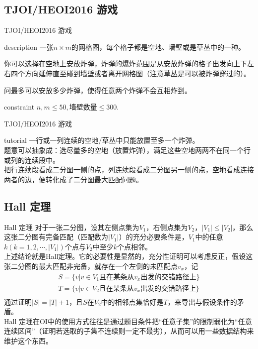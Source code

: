 \documentclass{beamer}
\begin{document}
\subsection{TJOI/HEOI2016 游戏}
\begin{frame}{TJOI/HEOI2016 游戏}
	\begin{block}{description}
		一张$n \times m$的网格图，每个格子都是空地、墙壁或是草丛中的一种。
		
		你可以选择在空地上安放炸弹，炸弹的爆炸范围是从安放炸弹的格子出发向上下左右四个方向延伸直至碰到墙壁或者离开网格图（注意草丛是可以被炸弹穿过的）。
		
		问最多可以安放多少炸弹，使得任意两个炸弹不会互相炸到。
	\end{block}
	\begin{block}{constraint}
		$n, m \le 50, \mbox{墙壁数量}\le 300.$
	\end{block}
\end{frame}
\begin{frame}{TJOI/HEOI2016 游戏}
	\begin{block}{tutorial}
		一行或一列连续的空地/草丛中只能放置至多一个炸弹。\\
		
		题意可以抽象成：选尽量多的空地（放置炸弹），满足这些空地两两不在同一个行或列的连续段中。\\
		
		把行连续段看成二分图一侧的点，列连续段看成二分图另一侧的点，空地看成连接两者的边，便转化成了二分图最大匹配问题。
	\end{block}
\end{frame}
\iffalse
\subsection{Hall 定理}
\begin{frame}{Hall 定理}
	对于一张二分图，设其左侧点集为$V_1$，右侧点集为$V_2$，$|V_1| \le |V_2|$，那么这张二分图有完备匹配（匹配数为$|V_1|$）的充分必要条件是，$V_1$中的任意$k(k = 1, 2, \cdots, |V_1|)$个点与$V_2$中至少$k$个点相邻。\\
	
	上述结论就是Hall定理。它的必要性是显然的，充分性证明可以考虑反正，假设这张二分图的最大匹配非完备，就存在一个左侧的未匹配点$v_x$，记
	\begin{align*}
		S = \{v | v \in V_1\mbox{且在某条从}v_x\mbox{出发的交错路径上}\}\\
		T = \{v | v \in V_2\mbox{且在某条从}v_x\mbox{出发的交错路径上}\}\\
	\end{align*}
	通过证明$|S| = |T| + 1$，且$S$在$V_2$中的相邻点集恰好是$T$，来导出与假设条件的矛盾。\\
	
	Hall 定理在OI中的使用方式往往是通过题目条件把“任意子集”的限制弱化为“任意连续区间”（证明若选取的子集不连续则一定不最劣），从而可以用一些数据结构来维护这个东西。
\end{frame}
\end{document}
